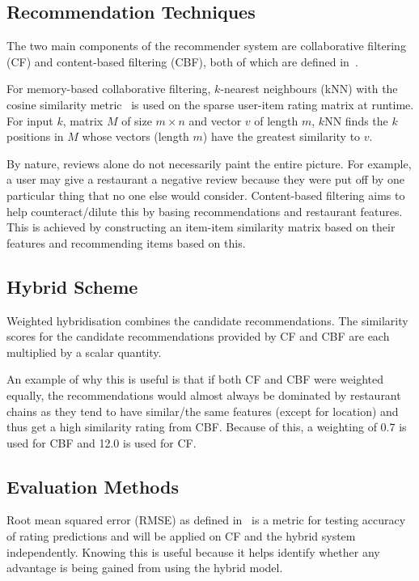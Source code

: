 \subsection{Recommendation Techniques}\label{subsec:recommendation-techniques}
The two main components of the recommender system are collaborative filtering (CF) and content-based filtering (CBF), both of which are defined in~\cite{burke2002hybrid}.

For memory-based collaborative filtering, $k$-nearest neighbours (kNN) with the cosine similarity metric~\cite{su2009survey} is used on the sparse user-item rating matrix at runtime.
For input $k$, matrix $M$ of size $m \times n$ and vector $v$ of length $m$, $k$NN finds the $k$ positions in $M$ whose vectors (length $m$) have the greatest similarity to $v$.

By nature, reviews alone do not necessarily paint the entire picture.
For example, a user may give a restaurant a negative review because they were put off by one particular thing that no one else would consider.
Content-based filtering aims to help counteract/dilute this by basing recommendations and restaurant features.
This is achieved by constructing an item-item similarity matrix based on their features and recommending items based on this.

\subsection{Hybrid Scheme}\label{subsec:hybrid-scheme}
Weighted hybridisation combines the candidate recommendations.
The similarity scores for the candidate recommendations provided by CF and CBF are each multiplied by a scalar quantity.

An example of why this is useful is that if both CF and CBF were weighted equally, the recommendations would almost always be dominated by restaurant chains as they tend to have similar/the same features (except for location) and thus get a high similarity rating from CBF\@.
Because of this, a weighting of 0.7 is used for CBF and 12.0 is used for CF\@.

\subsection{Evaluation Methods}\label{subsec:evaluation-methods}
Root mean squared error (RMSE) as defined in~\cite{shani2011evaluating} is a metric for testing accuracy of rating predictions and will be applied on CF and the hybrid system independently.
Knowing this is useful because it helps identify whether any advantage is being gained from using the hybrid model.

